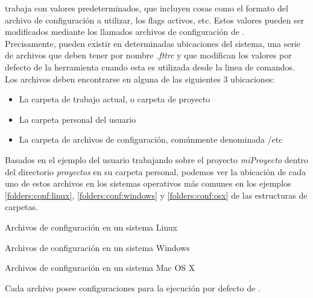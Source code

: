 \fronttier trabaja con valores predeterminados, que incluyen cosas como el
formato del archivo de configuración a utilizar, los flags activos, etc.
Estos valores pueden ser modificados mediante los llamados archivos de
configuración de \fronttier.\\
Precisamente, pueden existir en determinadas ubicaciones del sistema, una serie
de archivos que deben tener por nombre \emph{.fttrc} y que modifican los valores
por defecto de la herramienta cuando esta es utilizada desde la linea de comandos.
Los archivos deben encontrarse en alguna de las siguientes 3 ubicaciones:
\begin{itemize}
	\setlength{\itemsep}{1pt}
	\setlength{\parskip}{0pt}
	\setlength{\parsep}{0pt}
	\item La carpeta de trabajo actual, o carpeta de proyecto
	\item La carpeta personal del usuario
	\item La carpeta de archivos de configuración, comúnmente denominada /etc
\end{itemize}
Basados en el ejemplo del usuario trabajando sobre el proyecto \emph{miProyecto}
dentro del directorio \emph{proyectos} en su carpeta personal, podemos ver la
ubicación de cada uno de estos archivos en los sistemas operativos más comunes
en los ejemplos \ref{folders:conf:linux}, \ref{folders:conf:windows} y
\ref{folders:conf:osx} de las estructuras de carpetas.
\begin{folders}[h]
	\caption{Archivos de configuración en un sistema Linux}
	\label{folders:conf:linux}
\end{folders}

\begin{folders}[h]
	\caption{Archivos de configuración en un sistema Windows}
	\label{folders:conf:windows}
\end{folders}

\begin{folders}[h]
	\caption{Archivos de configuración en un sistema Mac OS X}
	\label{folders:conf:osx}
\end{folders}
Cada archivo posee configuraciones para la ejecución por defecto de \fronttier.\\

